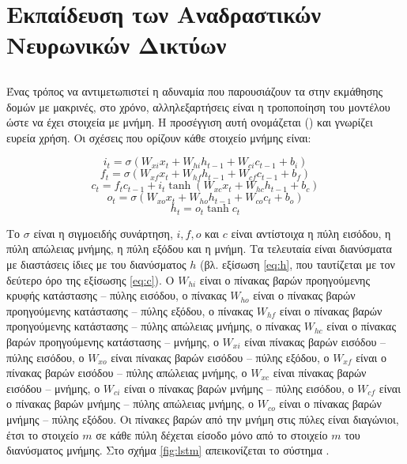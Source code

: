 \section{Εκπαίδευση των Αναδραστικών Νευρωνικών Δικτύων}
\subsection{}

Ένας τρόπος να αντιμετωπιστεί η αδυναμία που παρουσιάζουν τα  στην εκμάθησης δομών με μακρινές, στο χρόνο, αλληλεξαρτήσεις είναι η τροποποίηση του μοντέλου ώστε να έχει στοιχεία με μνήμη.
Η προσέγγιση αυτή ονομάζεται  ()\cite{Hochreiter1997} και γνωρίζει ευρεία χρήση. Οι σχέσεις που ορίζουν κάθε στοιχείο μνήμης είναι:

\begin{equation}
i_t = \sigma{(W_{xi}x_t + W_{hi}h_{t-1} + W_{ci}c_{t-1} + b_i)}
\end{equation}
\begin{equation}
f_t = \sigma{(W_{xf}x_t + W_{hf}h_{t-1} + W_{cf}c_{t-1} + b_f)}
\end{equation}
\begin{equation}
c_t = f_t c_{t-1} + i_t \tanh{(W_{xc} x_{t} + W_{hc} h_{t-1} + b_c)}\label{eq:c}
\end{equation}
\begin{equation}
o_t = \sigma(W_{xo}x_t + W_{ho} h_{t-1} + W_{co} c_t + b_o)
\end{equation}
\begin{equation}
h_t = o_t\tanh{c_t}
\end{equation}

Το $\sigma$ είναι η σιγμοειδής συνάρτηση, $i, f, o$ και $c$ είναι αντίστοιχα η πύλη εισόδου, η πύλη απώλειας μνήμης, η πύλη εξόδου και η μνήμη.
Τα τελευταία είναι διανύσματα με διαστάσεις ίδιες με του διανύσματος $h$ (βλ. εξίσωση \ref{eq:h}, που ταυτίζεται με τον δεύτερο όρο της εξίσωσης \ref{eq:c}).
O $W_{hi}$ είναι ο πίνακας βαρών προηγούμενης κρυφής κατάστασης -- πύλης εισόδου, ο πίνακας $W_{ho}$ είναι ο πίνακας βαρών προηγούμενης κατάστασης -- πύλης εξόδου, ο πίνακας $W_{hf}$ είναι ο πίνακας βαρών προηγούμενης κατάστασης -- πύλης απώλειας μνήμης, ο πίνακας $W_{hc}$ είναι ο πίνακας βαρών προηγούμενης κατάστασης -- μνήμης, ο $W_{xi}$ είναι πίνακας βαρών εισόδου -- πύλης εισόδου,  ο $W_{xo}$ είναι πίνακας βαρών εισόδου -- πύλης εξόδου, ο $W_{xf}$ είναι ο πίνακας βαρών εισόδου -- πύλης απώλειας μνήμης, ο $W_{xc}$ είναι πίνακας βαρών εισόδου -- μνήμης, ο $W_{ci}$ είναι ο πίνακας βαρών μνήμης -- πύλης εισόδου, ο $W_{cf}$ είναι ο πίνακας βαρών μνήμης -- πύλης απώλειας μνήμης, ο $W_{co}$ είναι ο πίνακας βαρών μνήμης -- πύλης εξόδου. Οι πίνακες βαρών από την μνήμη στις πύλες είναι διαγώνιοι, έτσι το στοιχείο $m$ σε κάθε πύλη δέχεται είσοδο μόνο από το στοιχείο $m$ του διανύσματος μνήμης. Στο σχήμα \ref{fig:lstm} απεικονίζεται το σύστημα .

